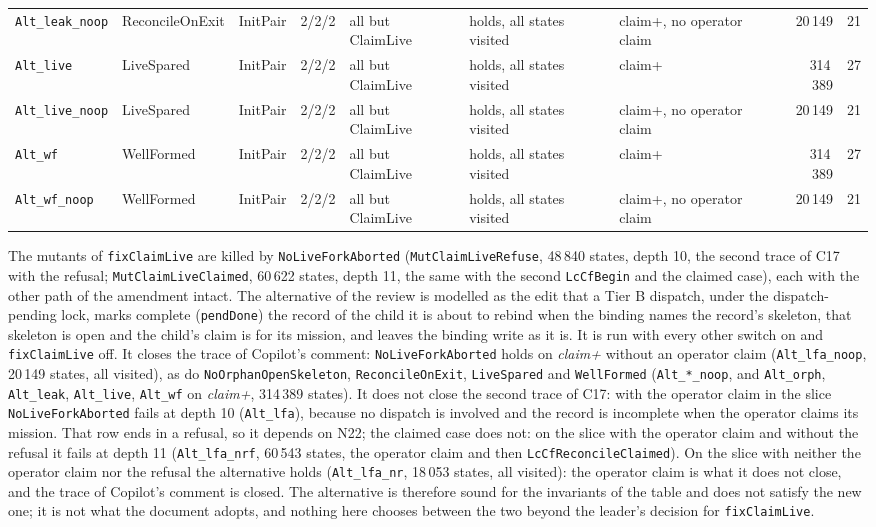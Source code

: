 \documentclass[a4paper,10pt,fleqn]{article}
\newcommand{\field}[1]{\texttt{#1}}
\begin{document}
{\begin{center}
\begin{tabularx}{\textwidth}{@{}l l l l X X l r r@{}}
\texttt{Alt\_leak\_noop} & ReconcileOnExit & InitPair & 2/2/2 & all but ClaimLive & holds, all states visited & claim+, no operator claim & 20\,149 & 21 \\
\texttt{Alt\_live} & LiveSpared & InitPair & 2/2/2 & all but ClaimLive & holds, all states visited & claim+ & 314\,389 & 27 \\
\texttt{Alt\_live\_noop} & LiveSpared & InitPair & 2/2/2 & all but ClaimLive & holds, all states visited & claim+, no operator claim & 20\,149 & 21 \\
\texttt{Alt\_wf} & WellFormed & InitPair & 2/2/2 & all but ClaimLive & holds, all states visited & claim+ & 314\,389 & 27 \\
\texttt{Alt\_wf\_noop} & WellFormed & InitPair & 2/2/2 & all but ClaimLive & holds, all states visited & claim+, no operator claim & 20\,149 & 21 \\
\bottomrule
\end{tabularx}
\end{center}
}

\noindent The mutants of \field{fixClaimLive} are killed by
\field{NoLiveForkAborted} (\texttt{MutClaimLiveRefuse}, 48\,840 states, depth
10, the second trace of C17 with the refusal; \texttt{MutClaimLiveClaimed},
60\,622 states, depth 11, the same with the second \field{LcCfBegin} and the
claimed case), each with the other path of the amendment intact. The
alternative of the review is modelled as the edit that a Tier B dispatch,
under the dispatch-pending lock, marks complete (\field{pendDone}) the
record of the child it is about to rebind when the binding names the record's
skeleton, that skeleton is open and the child's claim is for its mission, and
leaves the binding write as it is. It is run with every other switch on and
\field{fixClaimLive} off. It closes the trace of Copilot's comment:
\field{NoLiveForkAborted} holds on \emph{claim+} without an operator claim
(\texttt{Alt\_lfa\_noop}, 20\,149 states, all visited), as do
\field{NoOrphanOpenSkeleton}, \field{ReconcileOnExit}, \field{LiveSpared} and
\field{WellFormed} (\texttt{Alt\_*\_noop}, and \texttt{Alt\_orph},
\texttt{Alt\_leak}, \texttt{Alt\_live}, \texttt{Alt\_wf} on \emph{claim+}, 314\,389
states). It does not close the second trace of C17: with the operator claim in
the slice \field{NoLiveForkAborted} fails at depth 10
(\texttt{Alt\_lfa}), because no dispatch is involved and the record is
incomplete when the operator claims its mission. That row ends in a
refusal, so it depends on N22; the claimed case does not: on the slice with
the operator claim and without the refusal it fails at depth 11
(\texttt{Alt\_lfa\_nrf}, 60\,543 states, the operator claim and then
\field{LcCfReconcileClaimed}). On the slice with neither the operator claim
nor the refusal the alternative holds (\texttt{Alt\_lfa\_nr}, 18\,053 states,
all visited): the operator claim is what it does not close, and the trace of
Copilot's comment is closed. The alternative is therefore
sound for the invariants of the table and does not satisfy the new one; it is
not what the document adopts, and nothing here chooses between the two beyond
the leader's decision for \field{fixClaimLive}.
\end{document}
